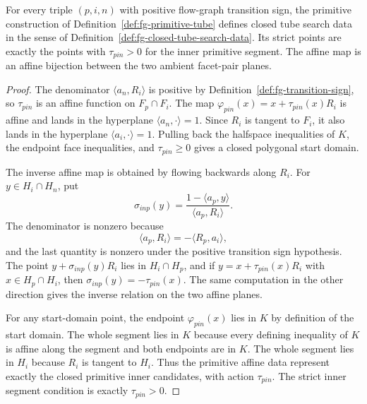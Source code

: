 \begin{unverified}
\begin{lemma}%
\label{lem:fg-primitive-tubes-affine}
For every triple \((p,i,n)\) with positive flow-graph transition sign, the
primitive construction of Definition~\ref{def:fg-primitive-tube} defines
closed tube search data in the sense of
Definition~\ref{def:fg-closed-tube-search-data}.  Its strict points are
exactly the points with \(\tau_{pin}>0\) for the inner primitive segment.
The affine map is an affine bijection between the two ambient facet-pair
planes.
\end{lemma}

\begin{proof}
The denominator \(\langle a_n,R_i\rangle\) is positive by
Definition~\ref{def:fg-transition-sign}, so \(\tau_{pin}\) is an affine
function on \(F_p\cap F_i\).  The map
\(\varphi_{pin}(x)=x+\tau_{pin}(x)R_i\) is affine and lands in the hyperplane
\(\langle a_n,\cdot\rangle=1\).  Since \(R_i\) is tangent to \(F_i\), it also
lands in the hyperplane \(\langle a_i,\cdot\rangle=1\).  Pulling back the
halfspace inequalities of \(K\), the endpoint face inequalities, and
\(\tau_{pin}\ge0\) gives a closed polygonal start domain.

The inverse affine map is obtained by flowing backwards along \(R_i\).  For
\(y\in H_i\cap H_n\), put
\[
  \sigma_{inp}(y)=
  \frac{1-\langle a_p,y\rangle}{\langle a_p,R_i\rangle}.
\]
The denominator is nonzero because
\[
  \langle a_p,R_i\rangle
  =-\langle R_p,a_i\rangle,
\]
and the last quantity is nonzero under the positive transition sign
hypothesis.  The point \(y+\sigma_{inp}(y)R_i\) lies in \(H_i\cap H_p\), and
if \(y=x+\tau_{pin}(x)R_i\) with \(x\in H_p\cap H_i\), then
\(\sigma_{inp}(y)=-\tau_{pin}(x)\).  The same computation in the other
direction gives the inverse relation on the two affine planes.

For any start-domain point, the endpoint
\(\varphi_{pin}(x)\) lies in \(K\) by definition of the start domain.  The
whole segment lies in \(K\) because every defining inequality of \(K\) is
affine along the segment and both endpoints are in \(K\).  The whole segment
lies in \(H_i\) because \(R_i\) is tangent to \(H_i\).  Thus the primitive
affine data represent exactly the closed primitive inner candidates, with
action \(\tau_{pin}\).  The strict inner segment condition is exactly
\(\tau_{pin}>0\).
\end{proof}
\end{unverified}

